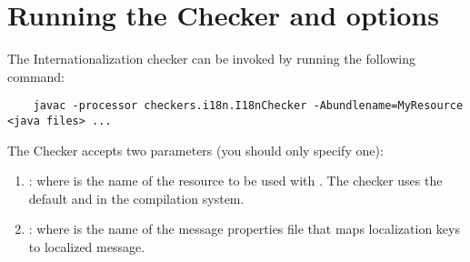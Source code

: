 \section{Running the Checker and options}

The Internationalization checker can be invoked by running the following
command:

\begin{Verbatim}
	javac -processor checkers.i18n.I18nChecker -Abundlename=MyResource <java files> ...
\end{Verbatim}

The Checker accepts two parameters (you should only specify one):

\begin{enumerate}

\item {}: where  is the
name of the resource to be used with
.
The checker uses the default  and  in the
compilation system.

\item {}: where  is the name of
the message properties file that maps localization keys to localized message.

\end{enumerate}
